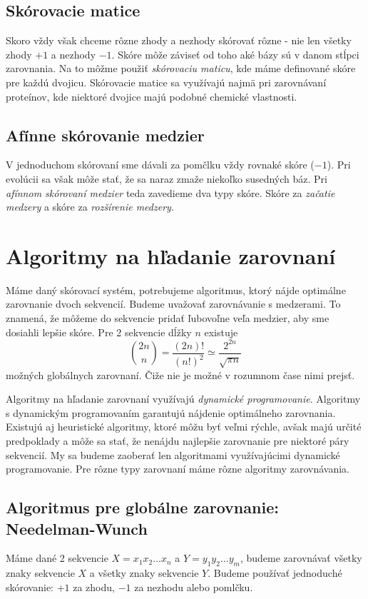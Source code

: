 \subsection{Skórovacie matice}
Skoro vždy však chceme rôzne zhody a nezhody skórovať rôzne - nie len všetky zhody $+1$ a nezhody $-1$.
Skóre môže záviseť od toho aké bázy sú v danom stĺpci zarovnania. Na to môžme použiť \textit{skórovaciu maticu}, kde máme definované skóre pre každú dvojicu. Skórovacie matice sa využívajú najmä pri zarovnávaní proteínov, kde niektoré dvojice majú podobné chemické vlastnosti.
\cite{durbin, skripta}

\subsection{Afínne skórovanie medzier}
V jednoduchom skórovaní sme dávali za pomčlku vždy rovnaké skóre ($-1$). Pri evolúcii sa však môže stať, že sa naraz zmaže niekoľko susedných báz. Pri \textit{afínnom skórovaní medzier} teda zavedieme dva typy skóre. Skóre za \textit{začatie medzery} a skóre za \textit{rozšírenie medzery}.
\cite{skripta}

\section[Algoritmy]{Algoritmy na hľadanie zarovnaní}
Máme daný skórovací systém, potrebujeme algoritmus, ktorý nájde optimálne zarovnanie dvoch sekvencií.
Budeme uvažovať zarovnávanie s medzerami. To znamená, že môžeme do sekvencie pridať ľubovoľne veľa medzier, aby sme dosiahli lepšie skóre. Pre 2 sekvencie dĺžky $n$ existuje 
$$ {2n \choose n}  = \frac{(2n)!}{(n!)^2} \simeq \frac{2^{2n}}{\sqrt{\pi n}} $$
možných globálnych zarovnaní. Čiže nie je možné v rozumnom čase nimi prejsť.

Algoritmy na hľadanie zarovnaní využívajú \textit{dynamické programovanie}. Algoritmy s dynamickým programovaním garantujú nájdenie optimálneho zarovnania.
Existujú aj heuristické algoritmy, ktoré môžu byť veľmi rýchle, avšak majú určité predpoklady a môže sa stať, že nenájdu najlepšie zarovnanie pre niektoré páry sekvencií.
My sa budeme zaoberať len algoritmami využívajúcimi dynamické programovanie. Pre rôzne typy zarovnaní máme rôzne algoritmy zarovnávania.
\cite{durbin, skripta}

\subsection{Algoritmus pre globálne zarovnanie: Needelman-Wunch}
Máme dané 2 sekvencie $X = x_1x_2\dots x_n$ a $Y = y_1y_2\dots y_m$, budeme zarovnávať všetky znaky sekvencie $X$ a všetky znaky sekvencie $Y$. Budeme používať jednoduché skórovanie: $+1$ za zhodu, $-1$ za nezhodu alebo pomlčku.

